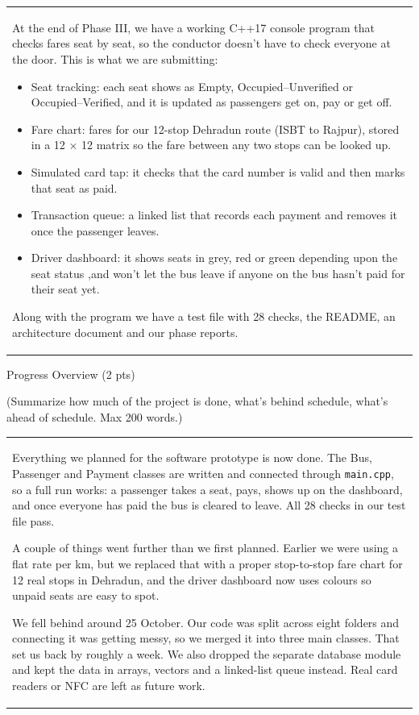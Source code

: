 \documentclass[12pt,a4paper]{article}
\newcommand{\sectiontitle}[1]{%
    {\color{GEUBlue}
    \fontsize{18}{22}\selectfont #1}
}
\newcommand{\instruction}[1]{%
    {\color{InstructionGrey}
    \fontsize{10.5}{13}\selectfont #1}
}
\newcommand{\answerbox}[2]{%
    \begin{tabularx}{\textwidth}{
        |>{\raggedright\arraybackslash}X|}
        \hline
        \parbox[t][#1][t]{\dimexpr\linewidth-12pt\relax}{
            \vspace{5pt}
            \fontsize{11}{13}\selectfont #2
        }\\
        \hline
    \end{tabularx}
}
\begin{document}
\answerbox{6.6cm}{At the end of Phase III, we have a working C++17 console program that checks fares seat by seat, so the conductor doesn’t have to check everyone at the door. This is what we are submitting:\\[-0.6cm]
\begin{itemize}[leftmargin=7pt]
\setlength{\itemsep}{0pt}
\setlength{\parskip}{0pt}
\setlength{\topsep}{0pt}
\item Seat tracking: each seat shows as Empty, Occupied–Unverified or Occupied–Verified, and it is updated as passengers get on, pay or get off.\\[-0.4cm]
\item Fare chart: fares for our 12-stop Dehradun route (ISBT to Rajpur), stored in a 12 × 12 matrix so the fare between any two stops can be looked up.\\[-0.4cm]
\item Simulated card tap: it checks that the card number is valid and then marks that seat as paid.\\[-0.4cm]
\item Transaction queue: a linked list that records each payment and removes it once the passenger leaves.\\[-0.4cm]
\item Driver dashboard: it shows seats in grey, red or green depending upon the seat status ,and won’t let the bus leave if anyone on the bus hasn’t paid for their seat yet.\\[-0.6cm]
\end{itemize}
Along with the program we have a test file with 28 checks, the README, an architecture document and our phase reports.}

\newpage

\sectiontitle{Progress Overview (2 pts)}

\vspace{0.05cm}

\instruction{
(Summarize how much of the project is done, what's behind schedule,
what's ahead of schedule. Max 200 words.)
}

\vspace{0.25cm}

\answerbox{6.3cm}{Everything we planned for the software prototype is now done. The Bus, Passenger and Payment classes are written and connected through \texttt{main.cpp}, so a full run works: a passenger takes a seat, pays, shows up on the dashboard, and once everyone has paid the bus is cleared to leave. All 28 checks in our test file pass.

A couple of things went further than we first planned. Earlier we were using a flat rate per km, but we replaced that with a proper stop-to-stop fare chart for 12 real stops in Dehradun, and the driver dashboard now uses colours so unpaid seats are easy to spot.

We fell behind around 25 October. Our code was split across eight folders and connecting it was getting messy, so we merged it into three main classes. That set us back by roughly a week. We also dropped the separate database module and kept the data in arrays, vectors and a linked-list queue instead. Real card readers or NFC are left as future work.}
\end{document}
